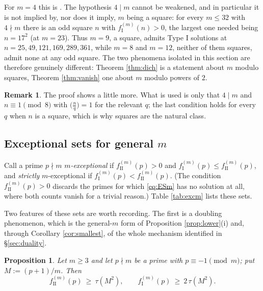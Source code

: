 \documentclass[11pt,reqno]{amsart}
\theoremstyle{plain}
\newtheorem{proposition}[theorem]{Proposition}
\theoremstyle{definition}
\newtheorem{remark}[theorem]{Remark}
\numberwithin{equation}{section}
\newcommand{\fI}{f_{\mathrm{I}}}
\newcommand{\fII}{f_{\mathrm{II}}}
\begin{document}
For $m=4$ this is \cite[Prop.~1.6]{ElsholtzTao}. The hypothesis $4\mid m$ cannot be
weakened, and in particular it is not implied by, nor does it imply, $m$ being a square:
for every $m\le32$ with $4\nmid m$ there is an odd square $n$ with
$\fI^{(m)}(n)>0$, the largest one needed being $n=17^{2}$ (at $m=23$). Thus $m=9$, a
square, admits Type I solutions at $n=25,49,121,169,289,361$, while $m=8$ and $m=12$,
neither of them squares, admit none at any odd square. The two phenomena isolated in
this section are therefore genuinely different: Theorem \ref{thm:dich} is a statement
about $m$ modulo squares, Theorem \ref{thm:vanish} one about $m$ modulo powers of $2$.

\begin{remark}
The proof shows a little more. What is used is only that $4\mid m$ and
$n\equiv1\pmod8$ with $\bigl(\tfrac nq\bigr)=1$ for the relevant $q$; the last condition
holds for every $q$ when $n$ is a square, which is why squares are the natural class.
\end{remark}

\subsection{Exceptional sets for general $m$}\label{sec:excm}
Call a prime $p\nmid m$ \emph{$m$-exceptional} if $\fII^{(m)}(p)>0$ and
$\fI^{(m)}(p)\le\fII^{(m)}(p)$, and \emph{strictly} $m$-exceptional if
$\fI^{(m)}(p)<\fII^{(m)}(p)$. (The condition $\fII^{(m)}(p)>0$ discards the primes
for which \eqref{eq:ESm} has no solution at all, where both counts vanish for a
trivial reason.) Table \ref{tab:excm} lists these sets.

Two features of these sets are worth recording. The first is a doubling phenomenon,
which is the general-$m$ form of Proposition \ref{prop:lower}(i) and, through
Corollary \ref{cor:smallest}, of the whole mechanism identified in \S\ref{sec:duality}.

\begin{proposition}\label{prop:doubling}
Let $m\ge3$ and let $p\nmid m$ be a prime with $p\equiv-1\pmod m$; put $M:=(p+1)/m$.
Then
\[
  \fII^{(m)}(p)\ \ge\ \tau(M^{2}),\qquad \fI^{(m)}(p)\ \ge\ 2\,\tau(M^{2}) .
\]
\end{proposition}
\end{document}
